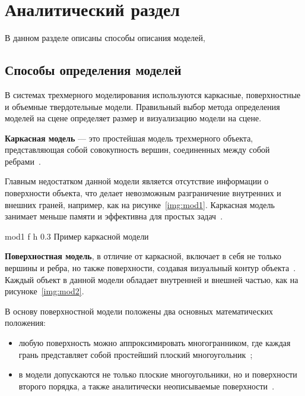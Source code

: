 \chapter{Аналитический раздел}
В данном разделе описаны способы описания моделей, 
\section{Способы определения моделей}

В системах трехмерного моделирования используются каркасные, поверхностные и объемные твердотельные модели. 
Правильный выбор метода определения моделей на сцене определяет размер и визуализацию модели на сцене.

\textbf{Каркасная модель} --- это простейшая модель трехмерного объекта, представляющая собой совокупность вершин, соединенных между собой ребрами~\cite{model_geom}.

Главным недостатком данной модели является отсутствие информации о поверхности объекта, что делает невозможным разграничение внутренних и внешних граней, например, как на рисунке~\ref{img:mod1}.
Каркасная модель занимает меньше памяти и эффективна для простых задач~\cite{model_geom_01}.
 

	{mod1} %
	{f} %
	{h} %
	{0.3\textwidth} %
	{Пример каркасной модели} %
	

\textbf{Поверхностная модель}, в отличие от каркасной, включает в себя не только вершины и ребра, но также поверхности, создавая визуальный контур объекта~\cite{model_geom}. Каждый объект в данной модели обладает внутренней и внешней частью, как на  рисуноке~\ref{img:mod2}.

В основу поверхностной модели положены два основных математических положения:
\begin{itemize}
	\item любую поверхность можно аппроксимировать многогранником, где каждая грань представляет собой простейший плоский многоугольник~\cite{model_geom_01};
	\item в модели допускаются не только плоские многоугольники, но и поверхности второго порядка, а также аналитически неописываемые поверхности~\cite{model_geom_01}.
\end{itemize}

